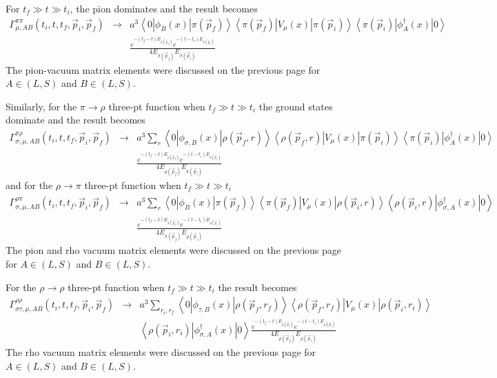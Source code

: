 \documentclass[12pt]{article}
\begin{document}
For $t_f\gg t\gg t_i$, the pion dominates and the result becomes
\begin{eqnarray}
\Gamma^{\pi\pi}_{\mu,AB}(t_i,t,t_f,\vec{p}_i,\vec{p}_f) &\to&
     a^3\left<0\left|\phi_B(x)\right|\pi(\vec{p}_f)\right>
     \left<\pi(\vec{p}_f)\left|V_\mu(x)\right|\pi(\vec{p}_i)\right>
     \left<\pi(\vec{p}_i)\left|\phi_A^\dagger(x)\right|0\right> \nonumber \\
  && \frac{e^{-(t_f-t)E_{\pi(\vec{p}_f)}}e^{-(t-t_i)E_{\pi(\vec{p}_i)}}}
     {4E_{\pi(\vec{p}_f)}E_{\pi(\vec{p}_i)}} \label{3point}
\end{eqnarray}
The pion-vacuum matrix elements were discussed on the previous page for
$A\in(L,S)$ and $B\in(L,S)$.

Similarly, for the $\pi\rightarrow\rho$ three-pt function when $t_f\gg t\gg t_i$ the 
ground states dominate and the result becomes
\begin{eqnarray}
\Gamma^{\pi\rho}_{\sigma,\mu,AB}(t_i,t,t_f,\vec{p}_i,\vec{p}_f) &\to&
     a^3\sum_r\left<0\left|\phi_{\sigma,B}(x)\right|\rho(\vec{p}_f,r)\right>
     \left<\rho(\vec{p}_f,r)\left|V_\mu(x)\right|\pi(\vec{p}_i)\right>
     \left<\pi(\vec{p}_i)\left|\phi_A^\dagger(x)\right|0\right> \nonumber \\
  && \frac{e^{-(t_f-t)E_{\rho(\vec{p}_f)}}e^{-(t-t_i)E_{\pi(\vec{p}_i)}}}
     {4E_{\rho(\vec{p}_f)}E_{\pi(\vec{p}_i)}} \label{pirho3point}
\end{eqnarray}
and for the $\rho\rightarrow\pi$ three-pt function when $t_f\gg t\gg t_i$ 
\begin{eqnarray}
\Gamma^{\rho\pi}_{\sigma,\mu,AB}(t_i,t,t_f,\vec{p}_i,\vec{p}_f) &\to&
     a^3\sum_r\left<0\left|\phi_{B}(x)\right|\pi(\vec{p}_f)\right>
     \left<\pi(\vec{p}_f)\left|V_\mu(x)\right|\rho(\vec{p}_i,r)\right>
     \left<\rho(\vec{p}_i,r)\left|\phi_{\sigma,A}^\dagger(x)\right|0\right> \nonumber \\
  && \frac{e^{-(t_f-t)E_{\pi(\vec{p}_f)}}e^{-(t-t_i)E_{\rho(\vec{p}_i)}}}
     {4E_{\pi(\vec{p}_f)}E_{\rho(\vec{p}_i)}} \label{rhopi3point}
\end{eqnarray}
The pion and rho vacuum matrix elements were discussed on the previous page for
$A\in(L,S)$ and $B\in(L,S)$.

For the $\rho\rightarrow\rho$ three-pt function when $t_f\gg t\gg t_i$ the 
result becomes
\begin{eqnarray}
\Gamma^{\rho\rho}_{\sigma\tau,\mu,AB}(t_i,t,t_f,\vec{p}_i,\vec{p}_f) &\to&
     a^3\sum_{r_i,r_f}\left<0\left|\phi_{\tau,B}(x)\right|\rho(\vec{p}_f,r_f)\right>
     \left<\rho(\vec{p}_f,r_f)\left|V_\mu(x)\right|\rho(\vec{p}_i,r_i)\right> \nonumber \\
  && \left<\rho(\vec{p}_i,r_i)\left|\phi_{\sigma,A}^\dagger(x)\right|0\right>
     \frac{e^{-(t_f-t)E_{\rho(\vec{p}_f)}}e^{-(t-t_i)E_{\rho(\vec{p}_i)}}}
     {4E_{\rho(\vec{p}_f)}E_{\rho(\vec{p}_i)}} \label{rhorho3point}
\end{eqnarray}
The rho vacuum matrix elements were discussed on the previous page for
$A\in(L,S)$ and $B\in(L,S)$.
\end{document}
